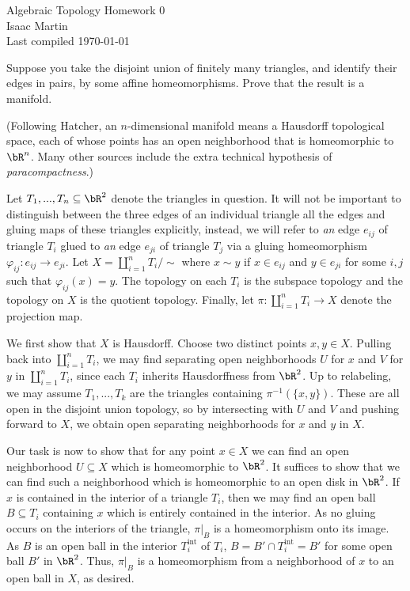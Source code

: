 

\def\sset{\subseteq}
\def\iso{\cong}
\def\gend#1{\langle #1\rangle}


\pagestyle{empty}
	\LARGE
\begin{center}
	Algebraic Topology Homework 0 \\
	\Large
	Isaac Martin \\
    Last compiled \today
\end{center}
\normalsize
\vspace{-2mm}
\hru
\begin{homework}[e]
    \prob Suppose you take the disjoint union of finitely many triangles, and identify their edges in pairs, by some affine homeomorphisms.  Prove that the result is a manifold.

    (Following Hatcher, an $n$-dimensional manifold means a Hausdorff topological space, each of whose points has an open neighborhood that is homeomorphic to $\bR^n$. Many other sources include the extra technical hypothesis of \emph{paracompactness}.)
	\begin{prf}
		Let $T_1,...,T_n \subseteq \bR^2$ denote the triangles in question. It will not be important to distinguish between the three edges of an individual triangle all the edges and gluing maps of these triangles explicitly, instead, we will refer to \emph{an} edge $e_{ij}$ of triangle $T_i$ glued to \emph{an} edge $e_{ji}$ of triangle $T_j$ via a gluing homeomorphism $\varphi_{ij}:e_{ij}\to e_{ji}$. Let $X = \coprod_{i = 1}^n T_i /\sim$ where $x \sim y$ if $x \in e_{ij}$ and $y \in e_{ji}$ for some $i,j$ such that $\varphi_{ij}(x) = y$. The topology on each $T_i$ is the subspace topology and the topology on $X$ is the quotient topology. Finally, let $\pi:\coprod_{i = 1}^n T_i \to X$ denote the projection map.

		We first show that $X$ is Hausdorff. Choose two distinct points $x,y \in X$. Pulling back into $\coprod_{i=1}^n T_i$, we may find separating open neighborhoods $U$ for $x$ and $V$ for $y$ in $\coprod_{i=1}^n T_i$, since each $T_i$ inherits Hausdorffness from $\bR^2$. Up to relabeling, we may assume $T_1,...,T_k$ are the triangles containing $\pi^{-1}(\{x,y\})$. These are all open in the disjoint union topology, so by intersecting with $U$ and $V$ and pushing forward to $X$, we obtain open separating neighborhoods for $x$ and $y$ in $X$.

		Our task is now to show that for any point $x \in X$ we can find an open neighborhood $U \subseteq X$ which is homeomorphic to $\bR^2$. It suffices to show that we can find such a neighborhood which is homeomorphic to an open disk in $\bR^2$. If $x$ is contained in the interior of a triangle $T_i$, then we may find an open ball $B \subseteq T_i$ containing $x$ which is entirely contained in the interior. As no gluing occurs on the interiors of the triangle, $\pi|_B$ is a homeomorphism onto its image. As $B$ is an open ball in the interior $T_i^{\text{int}}$ of $T_i$, $B = B' \cap T^{\text{int}}_i = B'$ for some open ball $B'$ in $\bR^2$. Thus, $\pi|_B$ is a homeomorphism from a neighborhood of $x$ to an open ball in $X$, as desired.


\end{prf}
\end{homework}

